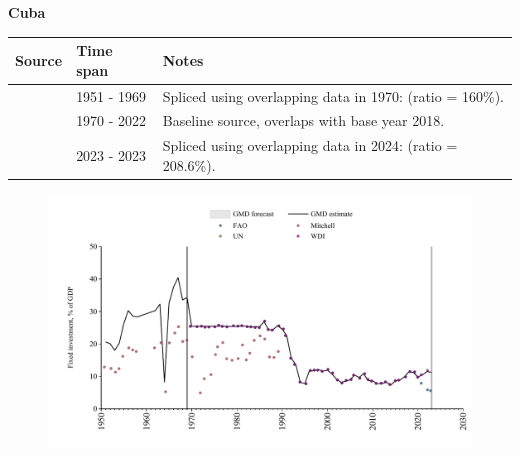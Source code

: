 \documentclass[12pt,a4paper,landscape]{article}
\begin{document}
\begin{adjustbox}{max totalsize={\paperwidth}{\paperheight},center}
\begin{minipage}[t][\textheight][t]{\textwidth}
\vspace*{0.5cm}
{}
\begin{center}
{\Large\bfseries Cuba}
\end{center}
\vspace{0.5cm}
\begin{table}[H]
\centering
\small
\begin{tabular}{|l|l|l|}
\hline
\textbf{Source} & \textbf{Time span} & \textbf{Notes} \\
\hline
\rowcolor{white}\cite{Mitchell}& 1951 - 1969 &Spliced using overlapping data in 1970: (ratio = 160\%).\\
\rowcolor{lightgray}\cite{WDI}& 1970 - 2022 &Baseline source, overlaps with base year 2018.\\
\rowcolor{white}\cite{FAO}& 2023 - 2023 &Spliced using overlapping data in 2024: (ratio = 208.6\%).\\
\hline
\end{tabular}
\end{table}
\begin{figure}[H]
\centering
\includegraphics[width=\textwidth,height=0.6\textheight,keepaspectratio]{graphs/CUB_finv_GDP.pdf}
\end{figure}
\end{minipage}
\end{adjustbox}
\end{document}
